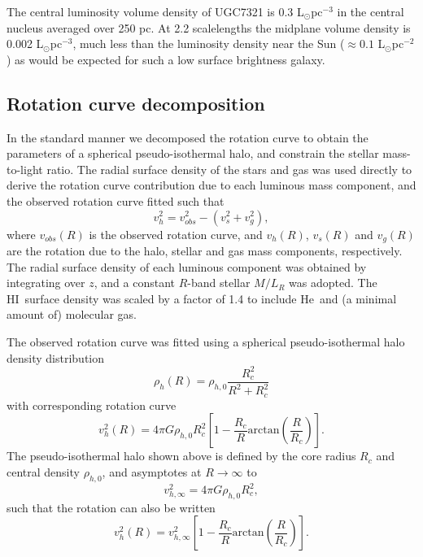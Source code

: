 \documentclass[traditabstract]{aa} %
\newcommand\HI{H{\small I}}
\newcommand\He{He}
\begin{document}
The central luminosity volume density of UGC7321 is 0.3 L$_{\odot}$pc$^{-3}$
in the central nucleus averaged over 250 pc. At 2.2 scalelengths the
midplane volume density is 0.002 L$_{\odot}$pc$^{-3}$, much less than the
luminosity density near the Sun ($\approx 0.1$ L$_{\odot}$pc$^{-2}$) as would
be expected for such a low surface brightness galaxy.



\subsection{Rotation curve decomposition}
\label{sec:ch7-rotcurve_decomp}

In the standard manner we decomposed the rotation curve to obtain the
parameters of a spherical pseudo-isothermal halo, and constrain the
stellar mass-to-light ratio. The radial surface density of the stars
and gas was used directly to derive the rotation curve contribution
due to each luminous mass component, and the observed rotation curve
fitted such that
\begin{equation}
v_h^2 = v_{obs}^2 - \left( v_s^2 + v_g^2 \right),
\end{equation}
where $v_{obs}(R)$ is the observed rotation curve, and $v_h(R)$,
$v_s(R)$ and $v_g(R)$ are the rotation due to the halo, stellar and
gas mass components, respectively. The radial surface density of each
luminous component was obtained by integrating over $z$, 
and a constant $R$-band stellar $M/L_R$ was adopted. The \HI\
surface density was scaled by a factor of 1.4 to include \He\ and
(a minimal amount of) molecular gas. 

The observed rotation curve was fitted using a spherical
pseudo-isothermal halo density distribution
\begin{equation}
\rho_h(R) = \rho_{h,0} \frac{R_c^2}{R^2 + R_c^2} 
\end{equation}
with corresponding rotation curve
\begin{equation}
v_h^2(R) = 4 \pi G \rho_{h,0} R_c^2 \left[ 1 -
  \frac{R_c}{R} \mathrm{arctan}\left(\frac{R}{R_c}\right) \right].
\end{equation}
 The pseudo-isothermal
halo shown above is defined by the core radius $R_c$ and central density
$\rho_{h,0}$, and asymptotes at $R\rightarrow\infty$ to 
\begin{equation}
v_{h,\infty}^2 = 4\pi G \rho_{h,0} R_c^2,
\end{equation}
such that the rotation can also be written
\begin{equation}
v_h^2(R) = v_{h,\infty}^2 \left[ 1 -
  \frac{R_c}{R} \mathrm{arctan}\left(\frac{R}{R_c}\right) \right].
\end{equation}
\end{document}

